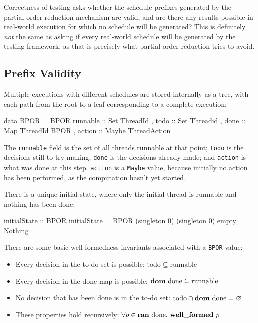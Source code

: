 Correctness of testing asks whether the schedule prefixes generated by
the partial-order reduction mechanism are valid, and are there any
results possible in real-world execution for which no schedule will be
generated? This is definitely \emph{not} the same as asking if every
real-world schedule will be generated by the testing framework, as
that is precisely what partial-order reduction tries to avoid.

\subsection{Prefix Validity}
\label{sec:correctness-testing-validity}

Multiple executions with different schedules are stored internally as
a tree, with each path from the root to a leaf corresponding to a
complete execution:

\begin{haskellcode}
data BPOR = BPOR
  { runnable :: Set ThreadId
  , todo     :: Set Threadid
  , done     :: Map ThreadId BPOR
  , action   :: Maybe ThreadAction
  }
\end{haskellcode}

The \verb|runnable| field is the set of all threads runnable at that
point; \verb|todo| is the decisions still to try making; \verb|done|
is the decisions already made; and \verb|action| is what was done at
this step. \verb|action| is a \verb|Maybe| value, because initially no
action has been performed, as the computation hasn't yet started.

There is a unique initial state, where only the initial thread is
runnable and nothing has been done:

\begin{haskellcode}
initialState :: BPOR
initialState = BPOR (singleton 0) (singleton 0) empty Nothing
\end{haskellcode}

There are some basic well-formedness invariants associated with a
\verb|BPOR| value:

\begin{itemize}
\item Every decision in the to-do set is possible:
  $\mathrm{todo} \subseteq \mathrm{runnable}$

\item Every decision in the done map is possible:
  $\mathbf{dom}~\mathrm{done} \subseteq \mathrm{runnable}$

\item No decision that has been done is in the to-do set:
  $\mathrm{todo} \cap \mathbf{dom}~\mathrm{done} = \varnothing$

\item These properties hold recursively:
  $\forall p \in \mathbf{ran}~\mathrm{done}.~\mathbf{well\_formed}~p$
\end{itemize}

